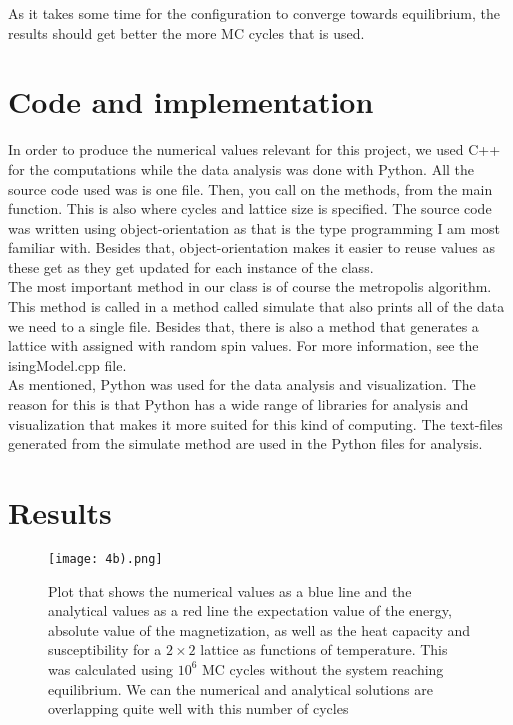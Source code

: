 \documentclass{article}
\begin{document}
As it takes some time for the configuration to converge towards equilibrium, the results should get better the more MC cycles that is used.



\section{Code and implementation}
In order to produce the numerical values relevant for this project, we used C++ for the computations while the data analysis was done with Python. All the source code used was is one file. Then, you call on the methods, from the main function. This is also where cycles and lattice size is specified. The source code was written using object-orientation as that is the type programming I am most familiar with. Besides that, object-orientation makes it easier to reuse values as these get as they get updated for each instance of the class. 
\\
The most important method in our class is of course the metropolis algorithm. This method is called in a method called simulate that also prints all of the data we need to a single file. Besides that, there is also a method that generates a lattice with assigned with random spin values. For more information, see the isingModel.cpp file. 
\\
As mentioned, Python was used for the data analysis and visualization. The reason for this is that Python has a wide range of libraries for analysis and visualization that makes it more suited for this kind of computing. The text-files generated from the simulate method are used in the Python files for analysis. 

\section{Results}

\begin{figure}[H]
	\centering
	\texttt{[image: 4b).png]}
	\centering
	\caption{Plot that shows the numerical values as a blue line  and the analytical values as a red line the expectation value of the energy, absolute value of the magnetization, as well as the heat capacity and susceptibility for a $2\times 2$ lattice as functions of temperature. This was calculated using $10^6$ MC cycles without the system reaching equilibrium. We can the numerical and analytical solutions are overlapping quite well with this number of cycles  }
	\label{fig: integration limits Gauss-Legendre}
\end{figure}
\end{document}
